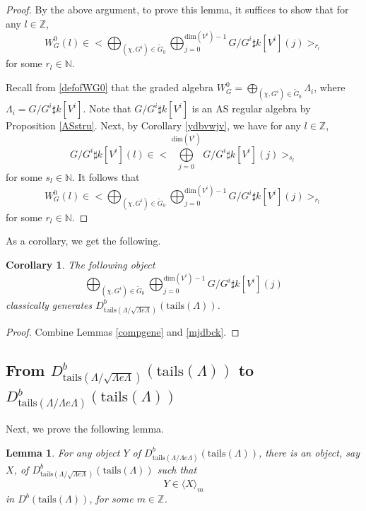 \documentclass[11pt,reqno]{amsart}
\newtheorem{lemma}[theorem]{Lemma}
\newtheorem{corollary}[theorem]{Corollary}
\theoremstyle{definition}
\begin{document}
\begin{proof}
By the above argument, to prove this lemma, it suffices to show that for any 
$l \in \mathbb{Z}$, $$W_G^{0}(l) \in \big< \bigoplus_{(\chi, G^i) \in \tilde{G}_0} 
\bigoplus_{j = 0}^{\mathrm{dim}(V^i) -1} G / G^i \sharp k[V^i](j) \big>_{r_l}$$ for some $r_l \in \mathbb{N}$.  

Recall from \eqref{defofWG0}
that the graded algebra
$W_{G}^{0} =
\bigoplus\limits_{(\chi, G^i) 
\in \tilde{G}_0} \Lambda_i$,
where
$\Lambda_i = G/G^i \sharp k[V^i]$. 
Note that $G/G^i \sharp k[V^i]$ is an AS regular algebra by Proposition \ref{ASstru}.
Next, by Corollary \ref{ydbvwjv}, we have 
for any $l \in \mathbb{Z}$, $$G/G^i \sharp k[V^i] (l) 
\in \big< \bigoplus\limits_{j= 0}^{\mathrm{dim}(V^i)} G/G^i \sharp k[V^i] (j) \big>_{s_l}$$ 
for some $s_l \in \mathbb{N}$.  
It follows that $$W_G^{0}(l) \in \big< \bigoplus_{(\chi, G^i) 
\in \tilde{G}_0} \bigoplus_{j = 0}^{\mathrm{dim}(V^i) -1} G / G^i 
\sharp k[V^i](j) \big>_{r_l}$$ for some $r_l \in \mathbb{N}$.  
\end{proof}

As a corollary, we get
the following.

\begin{corollary}
\label{cor:generator}
The following object
 $$\bigoplus_{(\chi, G^i) \in \tilde{G}_0} 
 \bigoplus_{j = 0}^{\mathrm{dim}(V^i) -1} G / G^i \sharp k[V^i](j)$$
classically generates
$D^{b}_{\mathrm{tails}
(\Lambda / \sqrt{\Lambda e \Lambda})}
( \mathrm{tails}(\Lambda))$.
\end{corollary}


\begin{proof}
Combine 
Lemmas \ref{compgene} and \ref{mjdbck}.
\end{proof}

\subsection{From
$D^b_{
\mathrm{tails}(\Lambda/
\sqrt{\Lambda e\Lambda})
}(\mathrm{tails}(\Lambda))$
to $D^b_{\mathrm{tails}
(\Lambda/\Lambda e\Lambda)}
(\mathrm{tails}(\Lambda))$}


Next, we prove the following lemma. 


\begin{lemma}\label{nribe}	
For any object $Y$ of $D^{b}_{\mathrm{tails}(\Lambda/\Lambda e \Lambda)}(\mathrm{tails}(\Lambda))$, 
there is an object, say $X$, of $D^{b}_{\mathrm{tails}(\Lambda/ 
\sqrt{ \Lambda e \Lambda})}(\mathrm{tails}(\Lambda))$ such that 
$$
Y \in \langle X  \rangle_{m}
$$
in $D^{b}(\mathrm{tails}(\Lambda))$, for some $m \in \mathbb{Z}$. 
\end{lemma}
\end{document}
